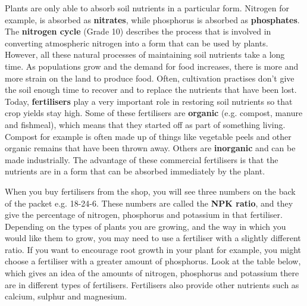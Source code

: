 Plants are only able to absorb soil nutrients in a particular form. Nitrogen for example, is absorbed as \textbf{nitrates}, while phosphorus is absorbed as \textbf{phosphates}. The \textbf{nitrogen cycle} (Grade 10) describes the process that is involved in converting atmospheric nitrogen into a form that can be used by plants. \\ 

However, all these natural processes of maintaining soil nutrients take a long time. As populations grow and the demand for food increases, there is more and more strain on the land to produce food. Often, cultivation practises don't give the soil enough time to recover and to replace the nutrients that have been lost. Today, \textbf{fertilisers} play a very important role in restoring soil nutrients so that crop yields stay high. Some of these fertilisers are \textbf{organic} (e.g. compost, manure and fishmeal), which means that they started off as part of something living. Compost for example is often made up of things like vegetable peels and other organic remains that have been thrown away. Others are \textbf{inorganic} and can be made industrially. The advantage of these commercial fertilisers is that the nutrients are in a form that can be absorbed immediately by the plant.


When you buy fertilisers from the shop, you will see three numbers on the back of the packet e.g. 18-24-6. These numbers are called the \textbf{NPK ratio}, and they give the percentage of nitrogen, phosphorus and potassium in that fertiliser. Depending on the types of plants you are growing, and the way in which you would like them to grow, you may need to use a fertiliser with a slightly different ratio. If you want to encourage root growth in your plant for example, you might choose a fertiliser with a greater amount of phosphorus. Look at the table below, which gives an idea of the amounts of nitrogen, phosphorus and potassium there are in different types of fertilisers. Fertilisers also provide other nutrients such as calcium, sulphur and magnesium. 

